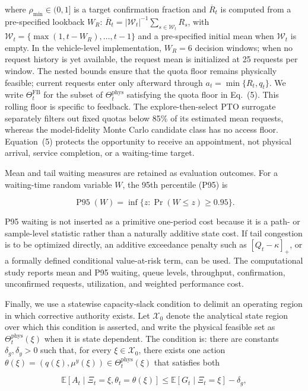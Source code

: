 \documentclass[preprint,12pt,authoryear,a4paper]{elsarticle}
\begin{document}
where \(\rho_{\min}\in(0,1]\) is a target confirmation fraction and \(\overline R_t\) is computed from a pre-specified lookback \(W_R\): \(\overline R_t=|\mathcal W_t|^{-1}\sum_{s\in\mathcal W_t}R_s\), with \(\mathcal W_t=\{\max(1,t-W_R),\ldots,t-1\}\) and a pre-specified initial mean when \(\mathcal W_t\) is empty. In the vehicle-level implementation, \(W_R=6\) decision windows; when no request history is yet available, the request mean is initialized at 25 requests per window. The nested bounds ensure that the quota floor remains physically feasible; current requests enter only afterward through \(a_t=\min\{R_t,q_t\}\). We write \(\Theta_t^{\mathrm{FB}}\) for the subset of \(\Theta_t^{\mathrm{phys}}\) satisfying the quota floor in Eq.~(5). This rolling floor is specific to feedback. The explore-then-select PTO surrogate separately filters out fixed quotas below 85\% of its estimated mean requests, whereas the model-fidelity Monte Carlo candidate class has no access floor. Equation~(5) protects the opportunity to receive an appointment, not physical arrival, service completion, or a waiting-time target.

Mean and tail waiting measures are retained as evaluation outcomes. For a waiting-time random variable \(W\), the 95th percentile (P95) is

\[
\operatorname{P95}(W)
=\inf\{z:\Pr(W\le z)\ge0.95\}.
\tag{6}
\]

P95 waiting is not inserted as a primitive one-period cost because it is a path- or sample-level statistic rather than a naturally additive state cost. If tail congestion is to be optimized directly, an additive exceedance penalty such as \([Q_t-\kappa]_+\), or a formally defined conditional value-at-risk term, can be used. The computational study reports mean and P95 waiting, queue levels, throughput, confirmation, unconfirmed requests, utilization, and weighted performance cost.

Finally, we use a statewise capacity-slack condition to delimit an operating region in which corrective authority exists. Let \(\mathcal X_0\) denote the analytical state region over which this condition is asserted, and write the physical feasible set as \(\Theta_t^{\mathrm{phys}}(\xi)\) when it is state dependent. The condition is: there are constants \(\delta_g,\delta_y>0\) such that, for every \(\xi\in\mathcal X_0\), there exists one action \(\theta(\xi)=(q(\xi),\mu^y(\xi))\in\Theta_t^{\mathrm{phys}}(\xi)\) that satisfies both

\[
\mathbb E[A_t\mid \Xi_t=\xi,\theta_t=\theta(\xi)]
\le \mathbb E[G_t\mid \Xi_t=\xi]-\delta_g,
\tag{7}
\]
\end{document}

